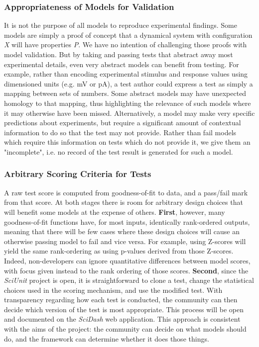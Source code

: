 \documentclass[11pt,letterpaper]{article}
\begin{document}
\subsubsection{Appropriateness of Models for Validation}
It is not the purpose of all models to reproduce experimental findings.  Some models are simply a proof of concept that a dynamical system with configuration \textit{X} will have properties \textit{P}.  We have no intention of challenging those proofs with model validation. But by taking and passing tests that abstract away most experimental details, even very abstract models can benefit from testing.  For example, rather than encoding experimental stimulus and response values using dimensioned units (e.g. mV or pA), a test author could express a test as simply a mapping between sets of numbers.  Some abstract models may have unexpected homology to that mapping, thus highlighting the relevance of such models where it may otherwise have been missed.  Alternatively, a model may make very specific predictions about experiments, but require a significant amount of contextual information to do so that the test may not provide.  Rather than fail models which require this information on tests which do not provide it, we give them an "incomplete", i.e. no record of the test result is generated for such a model.  

\subsubsection{Arbitrary Scoring Criteria for Tests}
A raw test score is computed from goodness-of-fit to data, and a pass/fail mark from that score.  At both stages there is room for arbitrary design choices that will benefit some models at the expense of others.  \textbf{First}, however, many goodness-of-fit functions have, for most inputs, identically rank-ordered outputs, meaning that there will be few cases where these design choices will cause an otherwise passing model to fail and vice versa.  For example, using Z-scores will yield the same rank-ordering as using p-values derived from those Z-scores.  Indeed, non-developers can ignore quantitative differences between model scores, with focus given instead to the rank ordering of those scores. \textbf{Second}, since the \textit{SciUnit} project is open, it is straightforward to clone a test, change the statistical choices used in the scoring mechanism, and use the modified test.  With transparency regarding how each test is conducted, the community can then decide which version of the test is most appropriate.  This process will be open and documented on the \textit{SciDash} web application.  This approach is consistent with the aims of the project: the community can decide on what models should do, and the framework can determine whether it does those things. 
\end{document}
